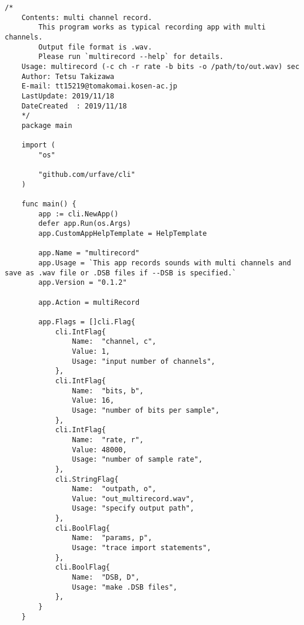 \begin{lstlisting}[caption=cmd/multirecord/main.go,label=multirecord/main]
    /*
    Contents: multi channel record.
        This program works as typical recording app with multi channels.
        Output file format is .wav.
        Please run `multirecord --help` for details.
    Usage: multirecord (-c ch -r rate -b bits -o /path/to/out.wav) sec
    Author: Tetsu Takizawa
    E-mail: tt15219@tomakomai.kosen-ac.jp
    LastUpdate: 2019/11/18
    DateCreated  : 2019/11/18
    */
    package main
    
    import (
        "os"
    
        "github.com/urfave/cli"
    )
    
    func main() {
        app := cli.NewApp()
        defer app.Run(os.Args)
        app.CustomAppHelpTemplate = HelpTemplate
    
        app.Name = "multirecord"
        app.Usage = `This app records sounds with multi channels and save as .wav file or .DSB files if --DSB is specified.`
        app.Version = "0.1.2"
    
        app.Action = multiRecord
    
        app.Flags = []cli.Flag{
            cli.IntFlag{
                Name:  "channel, c",
                Value: 1,
                Usage: "input number of channels",
            },
            cli.IntFlag{
                Name:  "bits, b",
                Value: 16,
                Usage: "number of bits per sample",
            },
            cli.IntFlag{
                Name:  "rate, r",
                Value: 48000,
                Usage: "number of sample rate",
            },
            cli.StringFlag{
                Name:  "outpath, o",
                Value: "out_multirecord.wav",
                Usage: "specify output path",
            },
            cli.BoolFlag{
                Name:  "params, p",
                Usage: "trace import statements",
            },
            cli.BoolFlag{
                Name:  "DSB, D",
                Usage: "make .DSB files",
            },
        }
    }
\end{lstlisting}

